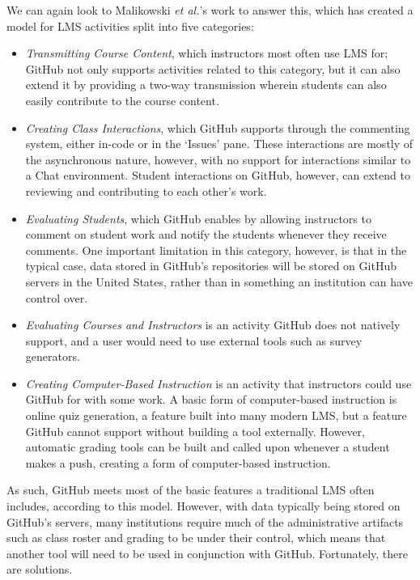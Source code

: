 We can again look to Malikowski \textit{et al.}'s \cite{malikowski2007model} work to answer this, which has created a model for LMS activities split into five categories:
\begin{itemize}
\item \emph{Transmitting Course Content}, which instructors most often use LMS for; GitHub not only supports activities related to this category, but it can also extend it by providing a two-way transmission wherein students can also easily contribute to the course content.
\item \emph{Creating Class Interactions}, which GitHub supports through the commenting system, either in-code or in the `Issues' pane. These interactions are mostly of the asynchronous nature, however, with no support for interactions similar to a Chat environment. Student interactions on GitHub, however, can extend to reviewing and contributing to each other's work.
\item \emph{Evaluating Students}, which GitHub enables by allowing instructors to comment on student work and notify the students whenever they receive comments. One important limitation in this category, however, is that in the typical case, data stored in GitHub's repositories will be stored on GitHub servers in the United States, rather than in something an institution can have control over.
\item \emph{Evaluating Courses and Instructors} is an activity GitHub does not natively support, and a user would need to use external tools such as survey generators.
\item \emph{Creating Computer-Based Instruction} is an activity that instructors could use GitHub for with some work. A basic form of computer-based instruction is online quiz generation, a feature built into many modern LMS, but a feature GitHub cannot support without building a tool externally. However, automatic grading tools can be built and called upon whenever a student makes a push, creating a form of computer-based instruction.
\end{itemize}

As such, GitHub meets most of the basic features a traditional LMS often includes, according to this model. However, with data typically being stored on GitHub's servers, many institutions require much of the administrative artifacts such as class roster and grading to be under their control, which means that another tool will need to be used in conjunction with GitHub. Fortunately, there are solutions.

